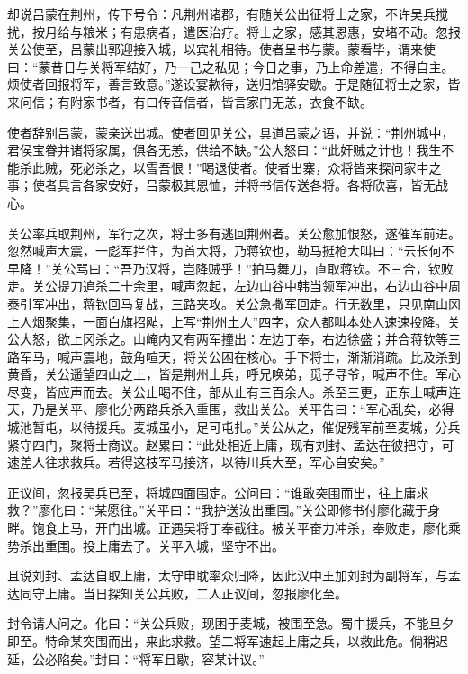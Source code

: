 却说吕蒙在荆州，传下号令：凡荆州诸郡，有随关公出征将士之家，不许吴兵搅扰，按月给与粮米；有患病者，遣医治疗。将士之家，感其恩惠，安堵不动。忽报关公使至，吕蒙出郭迎接入城，以宾礼相待。使者呈书与蒙。蒙看毕，谓来使曰：“蒙昔日与关将军结好，乃一己之私见；今日之事，乃上命差遣，不得自主。烦使者回报将军，善言致意。”遂设宴款待，送归馆驿安歇。于是随征将士之家，皆来问信；有附家书者，有口传音信者，皆言家门无恙，衣食不缺。

使者辞别吕蒙，蒙亲送出城。使者回见关公，具道吕蒙之语，并说：“荆州城中，君侯宝眷并诸将家属，俱各无恙，供给不缺。”公大怒曰：“此奸贼之计也！我生不能杀此贼，死必杀之，以雪吾恨！”喝退使者。使者出寨，众将皆来探问家中之事；使者具言各家安好，吕蒙极其恩恤，并将书信传送各将。各将欣喜，皆无战心。

关公率兵取荆州，军行之次，将士多有逃回荆州者。关公愈加恨怒，遂催军前进。忽然喊声大震，一彪军拦住，为首大将，乃蒋钦也，勒马挺枪大叫曰：“云长何不早降！”关公骂曰：“吾乃汉将，岂降贼乎！”拍马舞刀，直取蒋钦。不三合，钦败走。关公提刀追杀二十余里，喊声忽起，左边山谷中韩当领军冲出，右边山谷中周泰引军冲出，蒋钦回马复战，三路夹攻。关公急撒军回走。行无数里，只见南山冈上人烟聚集，一面白旗招飐，上写“荆州土人”四字，众人都叫本处人速速投降。关公大怒，欲上冈杀之。山崦内又有两军撞出：左边丁奉，右边徐盛；并合蒋钦等三路军马，喊声震地，鼓角喧天，将关公困在核心。手下将士，渐渐消疏。比及杀到黄昏，关公遥望四山之上，皆是荆州土兵，呼兄唤弟，觅子寻爷，喊声不住。军心尽变，皆应声而去。关公止喝不住，部从止有三百余人。杀至三更，正东上喊声连天，乃是关平、廖化分两路兵杀入重围，救出关公。关平告曰：“军心乱矣，必得城池暂屯，以待援兵。麦城虽小，足可屯扎。”关公从之，催促残军前至麦城，分兵紧守四门，聚将士商议。赵累曰：“此处相近上庸，现有刘封、孟达在彼把守，可速差人往求救兵。若得这枝军马接济，以待川兵大至，军心自安矣。”

正议间，忽报吴兵已至，将城四面围定。公问曰：“谁敢突围而出，往上庸求救？”廖化曰：“某愿往。”关平曰：“我护送汝出重围。”关公即修书付廖化藏于身畔。饱食上马，开门出城。正遇吴将丁奉截往。被关平奋力冲杀，奉败走，廖化乘势杀出重围。投上庸去了。关平入城，坚守不出。

且说刘封、孟达自取上庸，太守申耽率众归降，因此汉中王加刘封为副将军，与孟达同守上庸。当日探知关公兵败，二人正议间，忽报廖化至。

封令请人问之。化曰：“关公兵败，现困于麦城，被围至急。蜀中援兵，不能旦夕即至。特命某突围而出，来此求救。望二将军速起上庸之兵，以救此危。倘稍迟延，公必陷矣。”封曰：“将军且歇，容某计议。”

